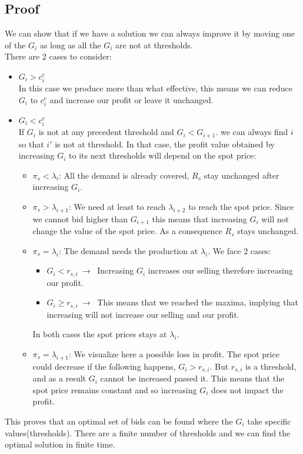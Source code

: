\documentclass[letterpaper]{article}
\begin{document}
\subsection{Proof}
We can show that if we have a solution we can always improve it by moving one of the $G_i$  as long as all the $G_i$ are not at thresholds.\\
There are 2 cases to consider:\\
\begin{itemize}
\item $G_i > c^e_i$\\
In this case we produce more than what effective, this means we can reduce $G_i$ to $c^e_i$ and increase our profit or leave it unchanged.
\item $G_i < c^e_i$\\
If $G_i$ is not at any precedent threshold and $G_i < G_{i+1}$. we can always find $i$ so that $i'$ is not at threshold. In that case, the profit value obtained by increasing $G_i$ to its next thresholds will depend on the spot price:\\
\begin{itemize}
\item $\pi_s < \lambda_i$: All the demand is already covered, $R_s$ stay unchanged after increasing $G_i$.
\item $\pi_s > \lambda_{i+1}$: We need at least to reach $\lambda_{i+2}$ to reach the spot price. Since we cannot bid higher than $G_{i+1}$ this means that increasing $G_i$ will not change the value of the spot price. As a consequence $R_s$ stays unchanged.
\item $\pi_s = \lambda_i$: The demand needs the production at $\lambda_i$. We face 2 cases:\\
\begin{itemize}
\item $G_i < r_{s,i} \ \rightarrow \ $ Increasing $G_i$ increases our selling therefore increasing our profit.
\item $G_i \geq r_{s,i}\ \rightarrow \ $ This means that we reached the maxima, implying that increasing will not increase our selling and our profit.\\
\end{itemize}
In both cases the spot prices stays at $\lambda_i$.
\item $\pi_s = \lambda_{i+1}$: We visualize here a possible loss in profit. The spot price could decrease if the following happens, $G_i > r_{s,i}$. But $r_{s,i}$ is a threshold, and as a result $G_i$ cannot be increased passed it. This means that the spot price remains constant and so increasing $G_i$ does not impact the profit.
\end{itemize}
\end{itemize}
This proves that an optimal set of bids can be found where the $G_i$ take specific values(thresholds). There are a finite number of thresholds and we can find the optimal solution in finite time. 
\end{document}
